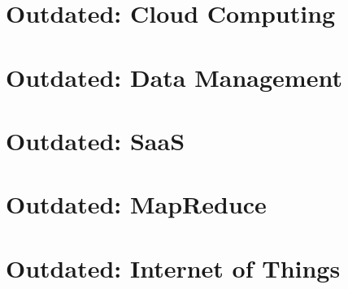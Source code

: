 
\part{Outdated: Cloud Computing}

%
%





\part{Outdated: Data Management}



\part{Outdated: SaaS}
\label{sec:icloud-saas}



\part{Outdated: MapReduce}





%
%

\part{Outdated: Internet of Things}


